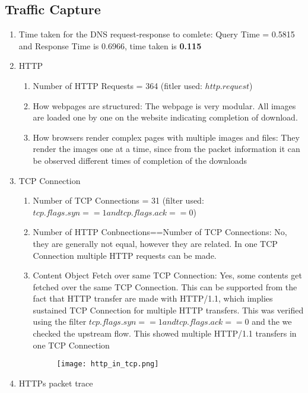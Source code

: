 \documentclass[12pt]{article}
\begin{document}
\subsection{Traffic Capture}
\renewcommand{\labelenumi}{\Alph{enumi}}
\begin{enumerate}
    \item Time taken for the DNS request-response to comlete: Query Time = 0.5815 and Response Time is 0.6966, time taken is \textbf{0.115}
    \item HTTP
    \begin{enumerate}
        \item Number of HTTP Requests = 364 (fitler used: $http.request$)
        \item How webpages are structured: The webpage is very modular. All images are loaded one by one on the website indicating completion of download.
        \item How browsers render complex pages with multiple images and files: They render the images one at a time, since from the packet information it can be observed different times of completion of the downloads
    \end{enumerate}
    \item TCP Connection
    \begin{enumerate}
        \item Number of TCP Connections = 31 (filter used: $tcp.flags.syn == 1 and tcp.flags.ack == 0$)
        \item Number of HTTP Conbnections==Number of TCP Connections: No, they are generally not equal, however they are related. In one TCP Connection multiple HTTP requests can be made.
        \item Content Object Fetch over same TCP Connection: Yes, some contents get fetched over the same TCP Connection. This can be supported from the fact that HTTP transfer are made with HTTP/1.1, which implies sustained TCP Connection for multiple HTTP transfers. This was verified using the filter $tcp.flags.syn==1 and tcp.flags.ack==0$ and the we checked the upstream flow. This showed multiple HTTP/1.1 transfers in one TCP Connection
        \begin{figure}[h!]
            \centering
            \texttt{[image: http\_in\_tcp.png]}
        \end{figure}
    \end{enumerate}
    \item HTTPs packet trace
    \begin{enumerate}

\end{enumerate}
\end{enumerate}
\end{document}
